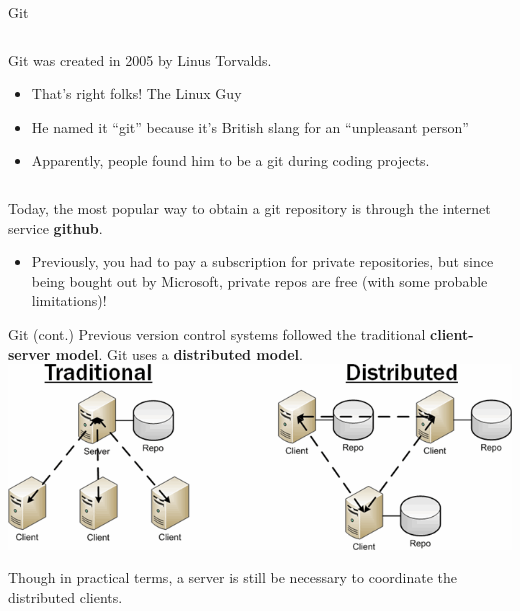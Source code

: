 \documentclass[11pt]{beamer}
\begin{document}
\begin{frame}{Git}
\begin{columns}
\begin{column}{0.6\textwidth}
Git was created in 2005 by Linus Torvalds.\\ 
\begin{itemize}
\item That's right folks! The Linux Guy
\item He named it ``git'' because it's British slang for an ``unpleasant person''
\item Apparently, people found him to be a git during coding projects.  
\end{itemize}
\end{column}
\begin{column}{0.38\textwidth}
\end{column}
\end{columns}
\vspace{1em}
Today, the most popular way to obtain a git repository is through the internet service \textbf{github}.  
\begin{itemize}
\item Previously, you had to pay a subscription for private repositories, but since being bought out by Microsoft, private repos are free (with some probable limitations)! 
\end{itemize}
\end{frame}

\begin{frame}{Git (cont.)}
Previous version control systems followed the traditional \textbf{client-server model}. Git uses a \textbf{distributed model}. \\ 
\vspace{1em}
\includegraphics[scale=0.4]{traddist.png}

Though in practical terms, a server is still be necessary to coordinate the distributed clients.  
\end{frame}
\end{document}
